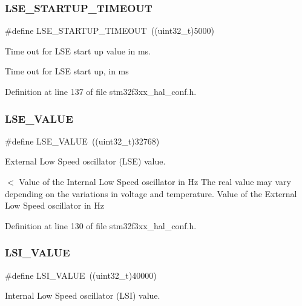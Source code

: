 \subsubsection{L\+S\+E\+\_\+\+S\+T\+A\+R\+T\+U\+P\+\_\+\+T\+I\+M\+E\+O\+UT}
{\footnotesize\ttfamily \#define L\+S\+E\+\_\+\+S\+T\+A\+R\+T\+U\+P\+\_\+\+T\+I\+M\+E\+O\+UT~((uint32\+\_\+t)5000)}



Time out for L\+SE start up value in ms. 

Time out for L\+SE start up, in ms 

Definition at line 137 of file stm32f3xx\+\_\+hal\+\_\+conf.\+h.

\mbox{\label{stm32f3xx__hal__conf_8h_a7bbb9d19e5189a6ccd0fb6fa6177d20d}} 
\subsubsection{L\+S\+E\+\_\+\+V\+A\+L\+UE}
{\footnotesize\ttfamily \#define L\+S\+E\+\_\+\+V\+A\+L\+UE~((uint32\+\_\+t)32768)}



External Low Speed oscillator (L\+SE) value. 

$<$ Value of the Internal Low Speed oscillator in Hz The real value may vary depending on the variations in voltage and temperature. Value of the External Low Speed oscillator in Hz 

Definition at line 130 of file stm32f3xx\+\_\+hal\+\_\+conf.\+h.

\mbox{\label{stm32f3xx__hal__conf_8h_a4872023e65449c0506aac3ea6bec99e9}} 
\subsubsection{L\+S\+I\+\_\+\+V\+A\+L\+UE}
{\footnotesize\ttfamily \#define L\+S\+I\+\_\+\+V\+A\+L\+UE~((uint32\+\_\+t)40000)}



Internal Low Speed oscillator (L\+SI) value. 




